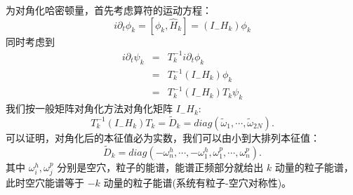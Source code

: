\documentclass[UTF8]{ctexart}
\begin{document}
为对角化哈密顿量，首先考虑算符的运动方程：
\begin{equation}
i\partial_{t}\phi_{k}=\left[\phi_{k},\hat{H}_{k}\right]=\left(I_{-}H_{k}\right)\phi_{k}
\end{equation}
同时考虑到
\begin{eqnarray}
i\partial_{t}\psi_{k} & = & T_{k}^{-1}i\partial_{t}\phi_{k}\nonumber \\
 & = & T_{k}^{-1}\left(I_{-}H_{k}\right)\phi_{k}\nonumber \\
 & = & T_{k}^{-1}\left(I_{-}H_{k}\right)T_{k}\psi_{k}
\end{eqnarray}
我们按一般矩阵对角化方法对角化矩阵 $I_{-}H_{k}$:
\begin{equation}
T_{k}^{-1}\left(I_{-}H_{k}\right)T_{k}=\tilde{D}_{k}=diag(\tilde{\omega}_{1},\cdots,\tilde{\omega}_{2N}).
\end{equation}
可以证明，对角化后的本征值必为实数，我们可以由小到大排列本征值：
\begin{equation}
\tilde{D}_{k}=diag(-\omega_{n}^{h},\cdots,-\omega_{1}^{h},\omega_{1}^{p},\cdots,\omega_{n}^{p}).
\end{equation}
其中 $\omega_{i}^{h},\omega_{j}^{p}$ 分别是空穴，粒子的能谱，能谱正频部分就给出 $k$ 动量的粒子能谱，此时空穴能谱等于
$-k$ 动量的粒子能谱(系统有粒子-空穴对称性)。
\end{document}
